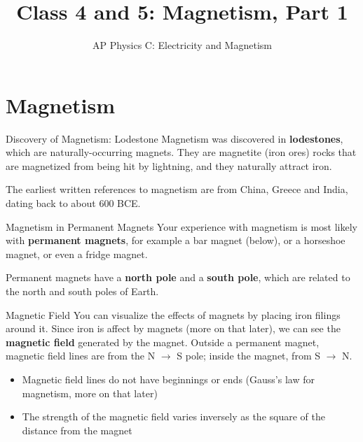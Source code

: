 \documentclass[12pt,aspectratio=169]{beamer}
\title{Class 4 and 5: Magnetism, Part 1}
\subtitle{AP Physics C: Electricity and Magnetism}
\begin{document}
\begin{frame}
  \maketitle
\end{frame}



\section[Discovery]{Magnetism}

\begin{frame}{Discovery of Magnetism: Lodestone}
  Magnetism was discovered in \textbf{lodestones}, which are naturally-occurring
  magnets. They are magnetite (iron ores) rocks that are magnetized from being
  hit by lightning, and they naturally attract iron.
  \begin{center}
  \end{center}
  The earliest written references to magnetism are from China, Greece and
  India, dating back to about 600 BCE.
\end{frame}



\begin{frame}{Magnetism in Permanent Magnets}
  Your experience with magnetism is most likely with \textbf{permanent
    magnets}, for example a bar magnet (below), or a horseshoe magnet, or even
  a fridge magnet.
  \begin{center}
  \end{center}
  Permanent magnets have a \textbf{north pole} and a \textbf{south pole}, which
  are related to the north and south poles of Earth.
\end{frame}


\begin{frame}{Magnetic Field}
  You can visualize the effects of magnets by placing iron filings around it.
  Since iron is affect by magnets (more on that later), we can see the
  \textbf{magnetic field} generated by the magnet.
  Outside a permanent magnet, magnetic field lines are from the N $\to$ S pole;
  inside the magnet, from S $\to$ N.
  \begin{center}
  \end{center}
  \begin{itemize}
  \item Magnetic field lines do not have beginnings or ends (Gauss's law for
    magnetism, more on that later)
  \item The strength of the magnetic field varies inversely as the square of
    the distance from the magnet
  \end{itemize}
\end{frame}
\end{document}
